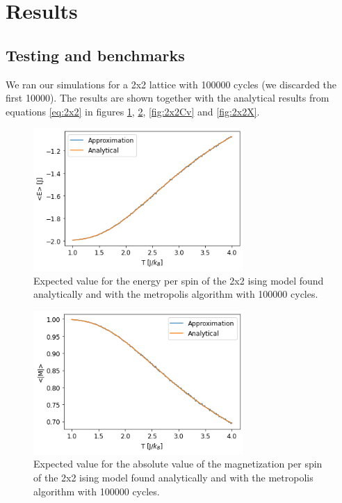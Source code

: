 \documentclass[reprint,english,notitlepage]{revtex4-1}
\begin{document}
\section{Results} %
	
\subsection{Testing and benchmarks}
	We ran our simulations for a 2x2 lattice with 100000 cycles (we discarded the first 10000). The results are shown together with the analytical results from equations \ref{eq:2x2} in figures \ref{fig:2x2E}, \ref{fig:2x2M}, \ref{fig:2x2Cv} and \ref{fig:2x2X}.
	\begin{figure}[H]
		\includegraphics[width=80mm]{../../Code/Figures/2x2E.png}
		\caption{Expected value for the energy per spin of the 2x2 ising model found analytically and with the metropolis algorithm with 100000 cycles.}
		\label{fig:2x2E}
	\end{figure}

	\begin{figure}[H]
		\includegraphics[width=80mm]{../../Code/Figures/2x2M.png}
		\caption{Expected value for the absolute value of the magnetization per spin of the 2x2 ising model found analytically and with the metropolis algorithm with 100000 cycles.}
		\label{fig:2x2M}
	\end{figure}
\end{document}
